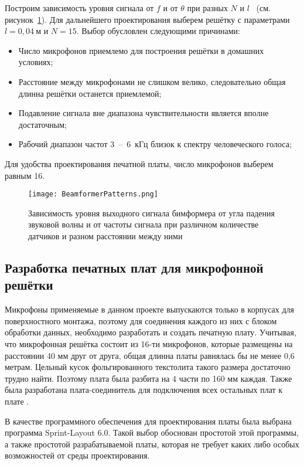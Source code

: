 Построим зависимость уровня сигнала от $f$ и от $\theta$ при разных $N$ и $l$~\cite{LabBookPages} (см. рисунок~\ref{fig:BeamformerPatterns}). Для дальнейшего проектирования выберем решётку с параметрами $l = 0,04~\text{м}$ и $N = 15$. Выбор обусловлен следующими причинами:
\begin{itemize}
	\item Число микрофонов приемлемо для построения решётки в домашних условиях;
	\item Расстояние между микрофонами не слишком велико, следовательно общая длинна решётки останется приемлемой;
	\item Подавление сигнала вне диапазона чувствительности является вполне достаточным;
	\item Рабочий диапазон частот 3~--~6~кГц близок к спектру человеческого голоса;
\end{itemize}

Для удобства проектирования печатной платы, число микрофонов выберем равным 16.

\begin{figure}[ht]
	\centering
	\texttt{[image: BeamformerPatterns.png]}  
	\caption{Зависимость уровня выходного сигнала бимформера от угла падения звуковой волны и от частоты сигнала при различном количестве датчиков и разном расстоянии между ними}
	\label{fig:BeamformerPatterns}
\end{figure}

\subsection{Разработка печатных плат для микрофонной решётки}
\label{section:PcbBuilding}
Микрофоны применяемые в данном проекте выпускаются только в корпусах для поверхностного монтажа, поэтому для соединения каждого из них с блоком обработки данных, необходимо разработать и создать печатную плату. Учитывая, что микрофонная решётка состоит из 16-ти микрофонов, которые размещены на расстоянии 40 мм друг от друга, общая длинна платы равнялась бы не менее 0,6 метрам. Цельный кусок фольгированного текстолита такого размера достаточно трудно найти. Поэтому плата была разбита на 4 части по 160 мм каждая. Также была разработана плата-соединитель для подключения всех остальных плат к плате \boardname{}. 

В качестве программного обеспечения для проектирования платы была выбрана программа Sprint-Layout 6.0. Такой выбор обоснован простотой этой программы, а также простотой разрабатываемой платы, которая не требует каких либо особых возможностей от среды проектирования.


